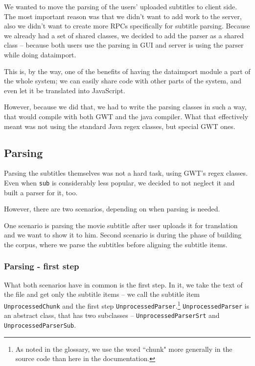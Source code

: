 We wanted to move the parsing of the users' uploaded subtitles to client side. The most important reason was that we didn't want to add work to the server, also we didn't want to create more RPCs specifically for subtitle parsing. Because we already had a set of shared classes, we decided to add the parser as a shared class -- because both users use the parsing in GUI and server is using the parser while doing dataimport.

This is, by the way, one of the benefits of having the dataimport module a part of the whole system; we can easily share code with other parts of the system, and even let it be translated into JavaScript.

However, because we did that, we had to write the parsing classes in such a way, that would compile with both GWT and the java compiler. What that effectively meant was not using the standard Java regex classes, but special GWT ones.

\subsection*{Parsing}
Parsing the subtitles themselves was not a hard task, using GWT's regex classes. Even when \texttt{sub} is considerably less popular, we decided to not neglect it and built a parser for it, too.

However, there are two scenarios, depending on when parsing is needed.

One scenario is parsing the movie subtitle after user uploads it for translation and we want to show it to him. Second scenario is during the phase of building the corpus, where we parse the subtitles before aligning the subtitle items.

\subsubsection*{Parsing - first step}
What both scenarios have in common is the first step. In it, we take the text of the file and get only the subtitle items -- we call the subtitle item \texttt{UnprocessedChunk} and the first step \texttt{UnprocessedParser}.\footnote{As noted in the glossary, we use the word ``chunk" more generally in the source code than here in the documentation.} \texttt{UnprocessedParser} is an abstract class, that has two subclasses -- \texttt{UnprocessedParserSrt} and \texttt{UnprocessedParserSub}.

